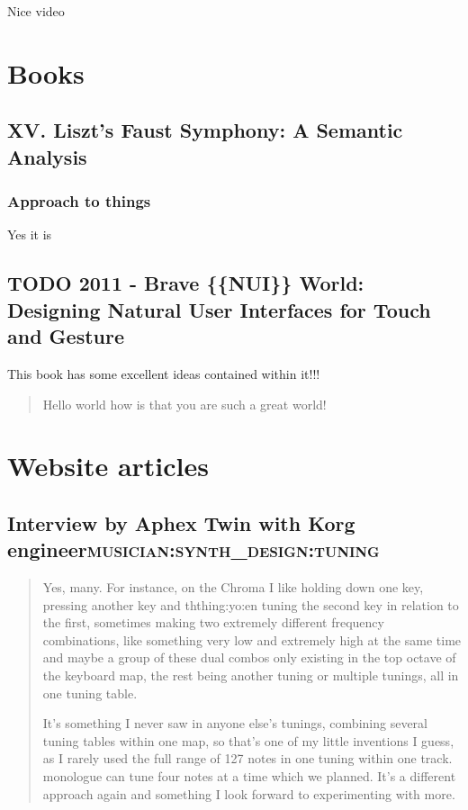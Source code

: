 \documentclass[11pt]{article}
\begin{document}
Nice video
\section{Books}
\label{sec:org60e7124}
\subsection{XV. Liszt's Faust Symphony: A Semantic Analysis}
\label{sec:org474eb0a}
\cite{il_xv}
\subsubsection{Approach to things}
\label{sec:org35c47cc}
Yes it is




\cite{quick13_gramm_haskel}



\subsection{{\bfseries\sffamily TODO} 2011 - Brave \{\{NUI\}\} World: Designing Natural User Interfaces for Touch and Gesture}
\label{sec:org4642a6f}
\cite{wigdor_brave_2011}

This book has some excellent ideas contained within it!!!

\begin{quote}
Hello world how is that you are such a great world!
\end{quote}

\section{Website articles}
\label{sec:org7a59c6c}
\subsection{Interview by Aphex Twin with Korg engineer\hfill{}\textsc{musician:synth\_design:tuning}}
\label{sec:org39b8e68}
\cite{_aphex_2017}

\begin{quote}
Yes, many. For instance, on the Chroma I like holding down one key, pressing
another key and ththing:yo:en tuning the second key in relation to the first,
sometimes making two extremely different frequency combinations, like something
very low and extremely high at the same time and maybe a group of these dual
combos only existing in the top octave of the keyboard map, the rest being
another tuning or multiple tunings, all in one tuning table.

It's something I never saw in anyone else's tunings, combining several
tuning tables within one map, so that's one of my little inventions I guess, as
I rarely used the full range of 127 notes in one tuning within one track.
monologue can tune four notes at a time which we planned. It's a different
approach again and something I look forward to experimenting with more.
\end{quote}
\end{document}
